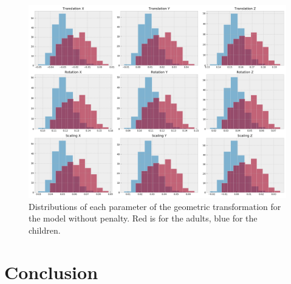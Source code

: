 \begin{figure}[htbp]
    \centering
	\includegraphics[width=\textwidth]{img_seg/transfo_matrix}
    \caption{Distributions of each parameter of the geometric transformation for the model without penalty. Red is for the adults, blue for the children.}
    \label{fig:transfo_matrix}
\end{figure}

\section{Conclusion}
